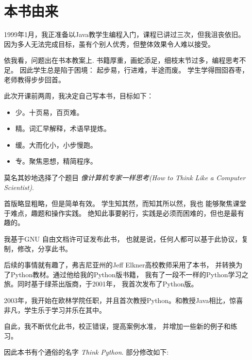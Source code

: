 \documentclass[10pt]{book}
\begin{document}
\section*{本书由来}

1999年1月，我正准备以Java教学生编程入门，课程已讲过三次，但我沮丧依旧。因为多人无法完成目标，虽有个别人优秀，但整体效果令人难以接受。

依我看，问题出在书本教案上.
书籍厚重，画蛇添足，细枝末节过多，编程思考不足。
因此学生总是陷于困境：  起步易，行进难，半途而废。
学生学得囫囵吞枣，老师教得步步回首。

此次开课前两周，我决定自己写本书，目标如下：

\begin{itemize}

\item 少。十页易，百页难。

\item 精。词汇早解释，术语早提炼。

\item 缓。大而化小，小步慢跑。

\item 专。聚焦思想，精简程序。

\end{itemize}

莫名其妙地选择了个题目 {\em 像计算机专家一样思考(How to Think Like
a Computer Scientist)}.

首版略显粗略，但是简单有效。
学生知其然，而知其所以然，我也
能够聚焦课堂于难点，趣题和操作实践。
绝知此事要躬行，实践是必须而困难的，但也是最有趣的。

我基于GNU 自由文档许可证发布此书，
也就是说，任何人都可以基于此协议，复制，修改，分享此书。

后续的事情就有趣了，弗吉尼亚州的Jeff Elkner高校教师采用了本书，
并转换为了Python教材。通过他给我的Python版书籍，
我有了一段不一样的Python学习之旅。同时基于绿茶出版商，于2001年，
我首次发布了Python版。

2003年，我开始在欧林学院任职，并且首次教授Python。和教授Java相比，惊喜非凡，学生乐于学习并乐在其中。

自此，我不断优化此书，校正错误，提高案例水准，
并增加一些新的例子和练习。

因此本书有个通俗的名字
{\em Think Python}.  部分修改如下:
\end{document}
